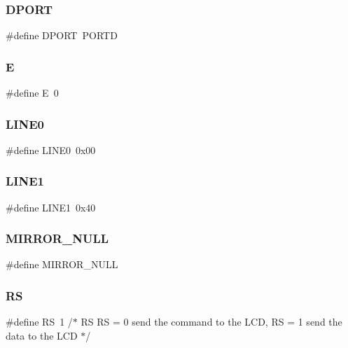 \mbox{\label{lcd_8h_a31549447999c751746a53ca9286653ff}} 
\subsubsection{D\+P\+O\+RT}
{\footnotesize\ttfamily \#define D\+P\+O\+RT~P\+O\+R\+TD}

\mbox{\label{lcd_8h_a07484107e6d9fdf38b53edf631d6511d}} 
\subsubsection{E}
{\footnotesize\ttfamily \#define E~0}

\mbox{\label{lcd_8h_a30ae842a69e31024b0577c01ba644056}} 
\subsubsection{L\+I\+N\+E0}
{\footnotesize\ttfamily \#define L\+I\+N\+E0~0x00}

\mbox{\label{lcd_8h_a4c0102b3d63c7bd2d59a424ca3815ad1}} 
\subsubsection{L\+I\+N\+E1}
{\footnotesize\ttfamily \#define L\+I\+N\+E1~0x40}

\mbox{\label{lcd_8h_a6da1e915279359c106dd4f6a0d721ac5}} 
\subsubsection{M\+I\+R\+R\+O\+R\+\_\+\+N\+U\+LL}
{\footnotesize\ttfamily \#define M\+I\+R\+R\+O\+R\+\_\+\+N\+U\+LL}

\mbox{\label{lcd_8h_af8903d8eea3868940c60af887473b152}} 
\subsubsection{RS}
{\footnotesize\ttfamily \#define RS~1 	/$\ast$ RS		RS = 0 send the command to the L\+CD, RS = 1 send the data to the L\+CD	$\ast$/}

